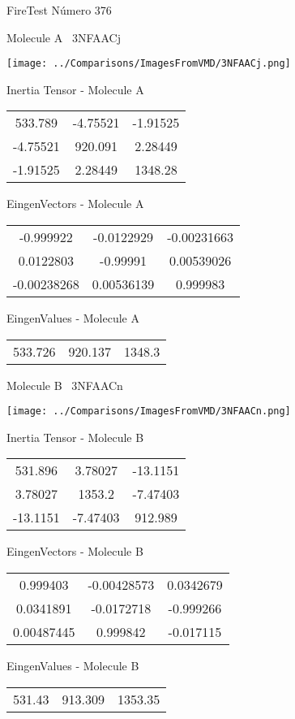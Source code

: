 \vtab[-3cm]
\begin{center}
{\large FireTest \tab Número 376}
\end{center}
\begin{multicols}{2}
\begin{center}

Molecule A \
3NFAACj

\texttt{[image: ../Comparisons/ImagesFromVMD/3NFAACj.png]}

Inertia Tensor - Molecule A \\
\begin{tabular}{|c c c|}
533.789	 & 	-4.75521	 & 	-1.91525	 \\
-4.75521	 & 	920.091	 & 	2.28449	 \\
-1.91525	 & 	2.28449	 & 	1348.28
\end{tabular}

\vtab
 EingenVectors - Molecule A     \\
\begin{tabular}{|c c c|}
-0.999922	 & 	-0.0122929	 & 	-0.00231663	 \\
0.0122803	 & 	-0.99991	 & 	0.00539026	 \\
-0.00238268	 & 	0.00536139	 & 	0.999983
\end{tabular}

\vtab
 EingenValues - Molecule A     \\
\begin{tabular}{|c c c|}
533.726	 & 	920.137	 & 	1348.3	 \\
\end{tabular}
\columnbreak

Molecule B \
3NFAACn

\texttt{[image: ../Comparisons/ImagesFromVMD/3NFAACn.png]}

Inertia Tensor - Molecule B \\
\begin{tabular}{|c c c|}
531.896	 & 	3.78027	 & 	-13.1151	 \\
3.78027	 & 	1353.2	 & 	-7.47403	 \\
-13.1151	 & 	-7.47403	 & 	912.989
\end{tabular}

\vtab
 EingenVectors - Molecule B     \\
\begin{tabular}{|c c c|}
0.999403	 & 	-0.00428573	 & 	0.0342679	 \\
0.0341891	 & 	-0.0172718	 & 	-0.999266	 \\
0.00487445	 & 	0.999842	 & 	-0.017115
\end{tabular}

\vtab
 EingenValues - Molecule B     \\
\begin{tabular}{|c c c|}
531.43	 & 	913.309	 & 	1353.35	 \\
\end{tabular}

\end{center}
\end{multicols}


